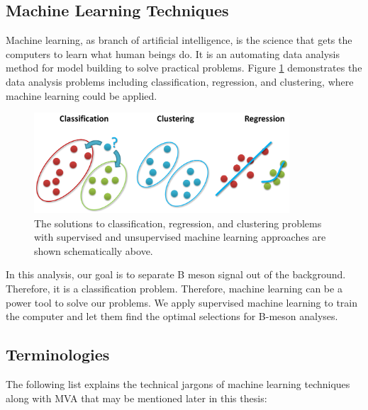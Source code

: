 \subsection{Machine Learning Techniques}

Machine learning, as branch of artificial intelligence, is the science that gets the computers to learn what human beings do. It is an automating data analysis method for model building to solve practical problems. Figure \ref{MLProblem} demonstrates the data analysis problems including classification, regression, and clustering, where machine learning could be applied.

\begin{figure}[h]
\begin{center}
\includegraphics[width= 0.85\textwidth]{Figures/Chapter4/MLProblemsNew.png}
\caption{The solutions to classification, regression, and clustering problems with supervised and unsupervised machine learning approaches are shown schematically above.}
\label{MLProblem}
\end{center}
\end{figure}

In this analysis, our goal is to separate B meson signal out of the background. Therefore, it is a classification problem. Therefore, machine learning can be a power tool to solve our problems. We apply supervised machine learning to train the computer and let them find the optimal selections for B-meson analyses.   


\subsection{Terminologies}

The following list explains the technical jargons of machine learning techniques along with MVA that may be mentioned later in this thesis:


